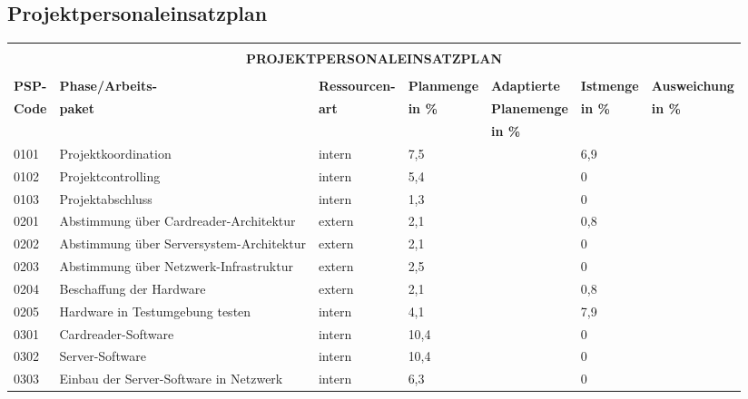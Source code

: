 \subsection{Projektpersonaleinsatzplan}
\begingroup
\renewcommand*{\arraystretch}{1.1} %
\begin{center}
\begin{scriptsize}
\begin{tabularx}{\textwidth}{|p{0.8cm}|p{2.2cm}|X|X|X|X|X|}
    \hline
    \multicolumn{7}{|c|}{\vspace{-0.02cm} \rowcolor{gray}} \\
    \multicolumn{7}{|c|}{\rowcolor{gray}\bfseries \normalsize \color{white} PROJEKTPERSONALEINSATZPLAN \vspace{-0.05cm}} \\
    \multicolumn{7}{|c|}{\rowcolor{gray}} \\
    \hline
    \textbf{PSP-} & \textbf{Phase/Arbeits-} &  \textbf{Ressourcen-} & \textbf{Planmenge} & \textbf{Adaptierte} & \textbf{Istmenge} & \textbf{Ausweichung}\\
    \textbf{Code} & \textbf{paket} &  \textbf{art} & \textbf{in \%} & \textbf{Planemenge} & \textbf{in \%} & \textbf{in \%}\\
    & & & & \textbf{in \%} & & \\
    \hline
    0101 & Projektkoordination & intern &7,5 & &6,9 & \\
    \hline
    0102 & Projektcontrolling & intern &5,4 & &0 & \\
    \hline
    0103 & Projektabschluss & intern &1,3 & &0 & \\
    \hline
    0201 & Abstimmung über Cardreader-Architektur & extern &2,1 & &0,8 & \\
    \hline
    0202 & Abstimmung über Serversystem-Architektur & extern &2,1 & &0 & \\
    \hline
    0203 & Abstimmung über Netzwerk-Infrastruktur & extern &2,5 & &0 & \\
    \hline
    0204 & Beschaffung der Hardware & extern &2,1 & &0,8 & \\
    \hline
    0205 & Hardware in Testumgebung testen & intern &4,1 & &7,9 & \\
    \hline
    0301 & Cardreader-Software & intern &10,4 & &0 & \\
    \hline
    0302 & Server-Software & intern &10,4 & &0 & \\
    \hline
    0303 & Einbau der Server-Software in Netzwerk & intern &6,3 & &0 & \\

\end{tabularx}
\end{scriptsize}
\end{center}
